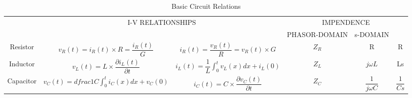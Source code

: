  \begin{table}[h]
	
	\begin{center}
			\begin{tabular}{cccccc}
				\toprule 
				\multirow{1}{*}{}	& \multicolumn{2}{c}{\multirow{ 2}{*}{I-V RELATIONSHIPS}} &	\multicolumn{3}{c}{IMPENDENCE}  \\ \cline{4-6}
				& &	&  PHASOR-DOMAIN & s-DOMAIN & \\ \hline
				Resistor	& $v_R(t)=i_R(t) \times R=\dfrac{i_R(t)}{G}$& $i_R(t)=\dfrac{v_R(t)}{R}=v_R(t) \times G$& $ Z_R $ & R & R\\ \hline
				Inductor	& $v_L(t)=L\times \dfrac{ \partial i_L(t)}{\partial t} $& $i_L(t)=\dfrac{1}{L} \int_{0}^{t} v_L(x)dx+ i_L(0)$& $ Z_L $ &$ j\omega L$ & Ls\\ \hline
				Capacitor	& $v_C(t)=dfrac{1}{C}\int_{0}^{t} i_C(x)dx+ v_C(0)$& $i_C(t)=C\times \dfrac{\partial v_C(t)}{\partial t} $& $ Z_C $ & $ \dfrac{1}{j\omega C} $& $\dfrac{1}{Cs}$\\ 
				\bottomrule
			\end{tabular}
		\caption{Basic Circuit Relations}
	\end{center}
\end{table}
